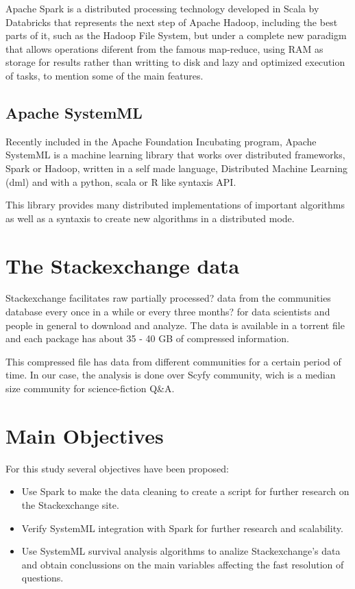 Apache Spark is a distributed processing technology developed in Scala by Databricks that represents the next step of Apache Hadoop, including the best parts of it, such as the Hadoop File System, but under a complete new paradigm that allows operations diferent from the famous map-reduce, using RAM as storage for results rather than writting to disk and lazy and optimized execution of tasks, to mention some of the main features.

\subsection{Apache SystemML}

Recently included in the Apache Foundation Incubating  program, Apache SystemML is a machine learning library that works over distributed frameworks, Spark or Hadoop, written in a self made language, Distributed Machine Learning (dml) and with a python, scala or R like syntaxis API.

This library provides many distributed implementations of important algorithms as well as a syntaxis to create new algorithms in a distributed mode.

\section{The Stackexchange data}

Stackexchange facilitates raw {partially processed?} data from the communities database every once in a while {or every three months?} for data scientists and people in general to download and analyze. The data is available in a torrent file and each package has about 35 - 40 GB of compressed information.

This compressed file has data from different communities for a certain period of time. In our case, the analysis is done over Scyfy community, wich is a median size community for science-fiction Q&A.

\section{Main Objectives}

For this study several objectives have been proposed:

\begin{itemize}

  \item Use Spark to make the data cleaning to create a script for further research on the Stackexchange site.

  \item Verify SystemML integration with Spark for further research and scalability.

  \item Use SystemML survival analysis algorithms to analize Stackexchange's data and obtain conclussions on the main variables affecting the fast resolution of questions.

\end{itemize}

